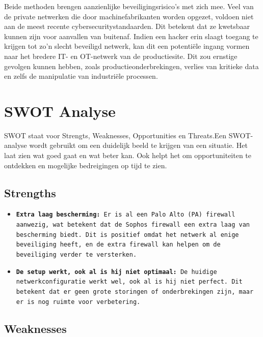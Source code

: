 Beide methoden brengen aanzienlijke beveiligingsrisico’s met zich mee. Veel van de private netwerken die door machinefabrikanten worden opgezet, voldoen niet aan de meest recente cybersecuritystandaarden. Dit betekent dat ze kwetsbaar kunnen zijn voor aanvallen van buitenaf. Indien een hacker erin slaagt toegang te krijgen tot zo’n slecht beveiligd netwerk, kan dit een potentiële ingang vormen naar het bredere IT- en OT-netwerk van de productiesite. Dit zou ernstige gevolgen kunnen hebben, zoals productieonderbrekingen, verlies van kritieke data en zelfs de manipulatie van industriële processen.




\section{SWOT Analyse}
SWOT staat voor Strengts, Weaknesses, Opportunities en Threats.Een SWOT-analyse wordt gebruikt om een duidelijk beeld te krijgen van een situatie. Het laat zien wat goed gaat en wat beter kan. Ook helpt het om opportuniteiten te ontdekken en mogelijke bedreigingen op tijd te zien. 


\subsection{Strengths}
\begin{itemize}
\item \texttt{\textbf{Extra laag bescherming:} Er is al een Palo Alto (PA) firewall aanwezig, wat betekent dat de Sophos firewall een extra laag van bescherming biedt. Dit is positief omdat het netwerk al enige beveiliging heeft, en de extra firewall kan helpen om de beveiliging verder te versterken.}

\item \texttt{\textbf{De setup werkt, ook al is hij niet optimaal:} De huidige netwerkconfiguratie werkt wel, ook al is hij niet perfect. Dit betekent dat er geen grote storingen of onderbrekingen zijn, maar er is nog ruimte voor verbetering.}


\end{itemize}

\subsection{Weaknesses}

